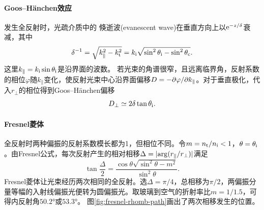 \paragraph{Goos--Hänchen效应}

发生全反射时，光疏介质中的
倏逝波(evanescent wave)在垂直方向上以$\mathop{}\!\mathrm{e}^{-z/\delta}$衰减，其中
\begin{equation}
    \label{eq:ed-evanescent-penetration}
    \delta^{-1} = \sqrt{k_\parallel^2 - k_\mathrm t^2}
    = k_\mathrm i\sqrt{\sin^2\theta_\mathrm i - \sin^2\theta_\mathrm c}.
\end{equation}
这里$k_\parallel = k_\mathrm i\sin\theta_\mathrm i$是沿界面的波数。
若光束的角谱很窄，且远离临界角，反射系数的相位$\varphi$随$k_\parallel$变化，使反射光束中心沿界面偏移$D = -\partial\varphi/\partial k_\parallel$。对于垂直极化，代入$r_\perp$的相位得到Goos--Hänchen偏移
\begin{equation}
    \label{eq:ed-goos-haenchen-shift}
    D_\perp \simeq 2\delta\tan\theta_\mathrm i .
\end{equation}

\paragraph{Fresnel菱体}

全反射时两种偏振的反射系数模长都为1，但相位不同。令$m = n_\mathrm t/n_\mathrm i < 1$，$\theta = \theta_\mathrm i$。由Fresnel公式，每次反射产生的相对相移$\Delta = \lvert\arg(r_\parallel/r_\perp)\rvert$满足
\[
    \tan\frac{\Delta}{2} = \frac{\cos\theta\sqrt{\sin^2\theta - m^2}}{\sin^2\theta}.
\]
Fresnel菱体让光束经历两次相同的全反射。选$\Delta = \pi/4$，总相移为$\pi/2$，两偏振分量等幅的入射线偏振光便转为圆偏振光。取玻璃到空气的折射率比$m = 1/1.5$，可得内反射角$\ang{50.2}$或$\ang{53.3}$。
图\ref{fig:fresnel-rhomb-path}画出了两次相移发生的位置。
\begin{notecaptionblock}
    \label{fig:fresnel-rhomb-path}
\end{notecaptionblock}


